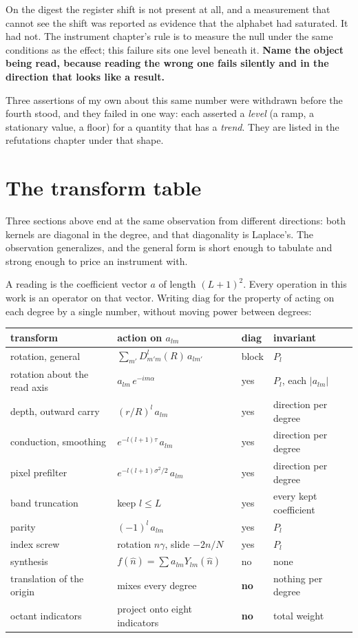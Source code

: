 On the digest the register shift is not present at all, and a measurement that cannot see the shift was reported as evidence that the alphabet had saturated. It had not. The instrument chapter's rule is to measure the null under the same conditions as the effect; this failure sits one level beneath it. \textbf{Name the object being read, because reading the wrong one fails silently and in the direction that looks like a result.}

Three assertions of my own about this same number were withdrawn before the fourth stood, and they failed in one way: each asserted a \emph{level} (a ramp, a stationary value, a floor) for a quantity that has a \emph{trend}. They are listed in the refutations chapter under that shape.

\section{The transform table}
\label{sec:transforms}

Three sections above end at the same observation from different directions: both kernels are diagonal in the degree, and that diagonality is Laplace's. The observation generalizes, and the general form is short enough to tabulate and strong enough to price an instrument with.

A reading is the coefficient vector \(a\) of length \((L+1)^2\). Every operation in this work is an operator on that vector. Writing \(\mathrm{diag}\) for the property of acting on each degree by a single number, without moving power between degrees:

\begin{center}
\begin{tabular}{llll}
\toprule
transform & action on \(a_{lm}\) & diag & invariant \\
\midrule
rotation, general & \(\sum_{m'} D^{l}_{m'm}(R)\, a_{lm'}\) & block & \(P_l\) \\
rotation about the read axis & \(a_{lm}\, e^{-im\alpha}\) & yes & \(P_l\), each \(|a_{lm}|\) \\
depth, outward carry & \((r/R)^{l}\, a_{lm}\) & yes & direction per degree \\
conduction, smoothing & \(e^{-l(l+1)\tau}\, a_{lm}\) & yes & direction per degree \\
pixel prefilter & \(e^{-l(l+1)\sigma^2/2}\, a_{lm}\) & yes & direction per degree \\
band truncation & keep \(l \le L\) & yes & every kept coefficient \\
parity & \((-1)^{l}\, a_{lm}\) & yes & \(P_l\) \\
index screw & rotation \(n\gamma\), slide \(-2n/N\) & yes & \(P_l\) \\
synthesis & \(f(\hat n) = \sum a_{lm} Y_{lm}(\hat n)\) & no & none \\
translation of the origin & mixes every degree & \textbf{no} & nothing per degree \\
octant indicators & project onto eight indicators & \textbf{no} & total weight \\
\bottomrule
\end{tabular}
\end{center}

